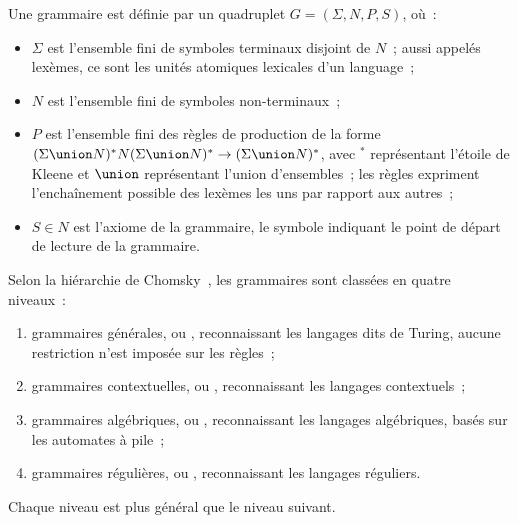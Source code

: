 \begin{definition}[Grammaire]

Une grammaire est définie par un quadruplet $G = (\Sigma, N, P, S)$, où~:
%
\begin{itemize}

\item $\Sigma$ est l'ensemble fini de {\strong symboles terminaux} disjoint de
$N$~; aussi appelés {\strong lexèmes}, ce sont les unités atomiques lexicales
d'un language~;

\item $N$ est l'ensemble fini de {\strong symboles non-terminaux}~;

\item $P$ est l'ensemble fini des {\strong règles de production} de la forme
$(\Sigma \union N)^* N (\Sigma \union N)^* \rightarrow (\Sigma \union N)^*$,
avec $^*$ représentant l'étoile de Kleene et $\union$ représentant l'union
d'ensembles~; les règles expriment l'enchaînement possible des lexèmes les uns
par rapport aux autres~;

\item $S \in N$ est l'axiome de la grammaire, le symbole indiquant le point de
départ de lecture de la grammaire.

\end{itemize}

\end{definition}

Selon la hiérarchie de Chomsky~, les grammaires sont classées
en quatre niveaux~:
%
\begin{enumerate}

\item grammaires {\strong générales}, ou ,
reconnaissant les langages dits de Turing, aucune restriction n'est imposée sur
les règles~;

\item grammaires {\strong contextuelles}, ou , reconnaissant les langages contextuels~;

\item grammaires {\strong algébriques}, ou ,
reconnaissant les langages algébriques, basés sur les automates à pile~;

\item grammaires {\strong régulières}, ou ,
reconnaissant les langages réguliers.

\end{enumerate}
%
Chaque niveau est plus général que le niveau suivant.

